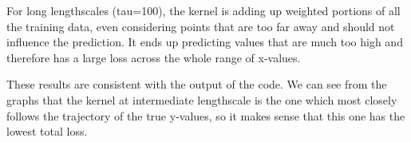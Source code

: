 \documentclass[submit]{harvardml}
\begin{document}
\begin{enumerate}
  For long lengthscales (tau=100), the kernel is adding up weighted portions of all the training data, even considering points that are too far away and should not influence the prediction. It ends up predicting values that are much too high and therefore has a large loss across the whole range of x-values.
  
  These results are consistent with the output of the code. We can see from the graphs that the kernel at intermediate lengthscale is the one which most closely follows the trajectory of the true y-values, so it makes sense that this one has the lowest total loss.


\end{enumerate}

\newpage

\end{document}
